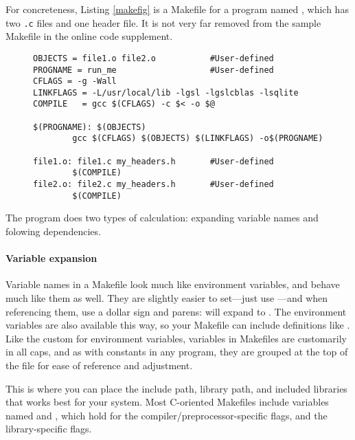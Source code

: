 For concreteness, 
Listing \ref{makefig} is a Makefile for a program named ,
which has two {\tt .c} files and one header file. It is not very far
removed from the sample Makefile in the online code supplement.

\begin{figure}[htb]
\begin{lstlisting}
OBJECTS = file1.o file2.o           #User-defined
PROGNAME = run_me                   #User-defined
CFLAGS = -g -Wall
LINKFLAGS = -L/usr/local/lib -lgsl -lgslcblas -lsqlite
COMPILE   = gcc $(CFLAGS) -c $< -o $@

$(PROGNAME): $(OBJECTS)
        gcc $(CFLAGS) $(OBJECTS) $(LINKFLAGS) -o$(PROGNAME)

file1.o: file1.c my_headers.h       #User-defined
        $(COMPILE)
file2.o: file2.c my_headers.h       #User-defined
        $(COMPILE)
\end{lstlisting}
    \setlistdefaults
\end{figure}

The  program does two types of calculation: expanding variable
names and folowing dependencies. 

\paragraph{Variable expansion}
Variable names in a Makefile look much like environment
variables, and behave much like them as well. They are slightly easier to
set---just use ---and when referencing them, use a
dollar sign and parens:  will expand to .
The environment variables are also available this way, so
your Makefile can include definitions like .  Like the custom for environment
variables, variables in Makefiles are customarily in all caps, and as
with constants in any program, they are grouped at the top of the file
for ease of reference and adjustment. 

This is where you can place the include path, library path, and included
libraries that works best for your system. Most C-oriented Makefiles
include variables named  and , which hold
for the compiler/preprocessor-specific flags, and the library-specific
flags.

